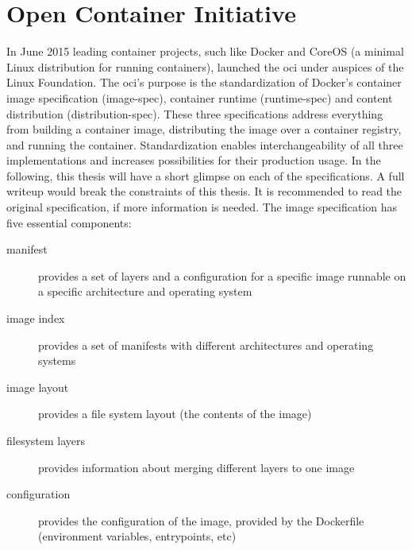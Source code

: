 \documentclass[titlepage]{report}
\begin{document}
\section{Open Container Initiative}
In June 2015 leading container projects, such like Docker and CoreOS (a minimal Linux distribution for running containers), launched the \gls{oci}
under auspices of the Linux Foundation\cite{OCIabout}. The \gls{oci}'s purpose is the standardization of Docker's container image specification (image-spec\cite{ImageSpec}), container runtime (runtime-spec\cite{RuntimeSpec})
and content distribution (distribution-spec\cite{DistributionSpec}). These three specifications address everything from building a container image, distributing the image
over a container registry, and running the container. Standardization enables interchangeability of all three implementations and increases possibilities for their production usage.
In the following, this thesis will have a short glimpse on each of the specifications. A full writeup would break the constraints of this thesis. It is recommended to read
the original specification, if more information is needed. The image specification has five essential components:

\begin{description}
    \item[manifest] provides a set of layers and a configuration for a specific image runnable on a specific architecture and operating system
    \item[image index] provides a set of manifests with different architectures and operating systems
    \item[image layout] provides a file system layout (the contents of the image) 
    \item[filesystem layers] provides information about merging different layers to one image
    \item[configuration] provides the configuration of the image, provided by the Dockerfile (environment variables, entrypoints, etc)
\end{description}
\end{document}
